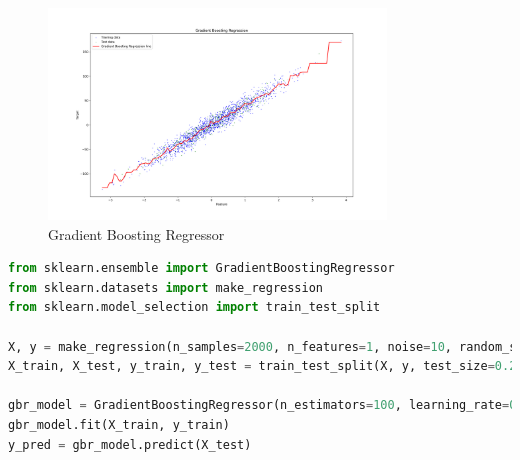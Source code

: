 \begin{figure}[H]
	\centering
	\includegraphics[width=0.8\textwidth]{./Images/Gradient-Boosting-Regression.png}
	\caption{Gradient Boosting Regressor}
	\label{fig:gradient-boosting-regressor}
\end{figure}

\begin{lstlisting}[language=Python, caption=Gradient Boosting Regressor Example]
from sklearn.ensemble import GradientBoostingRegressor
from sklearn.datasets import make_regression
from sklearn.model_selection import train_test_split

X, y = make_regression(n_samples=2000, n_features=1, noise=10, random_state=42)
X_train, X_test, y_train, y_test = train_test_split(X, y, test_size=0.2, random_state=42)

gbr_model = GradientBoostingRegressor(n_estimators=100, learning_rate=0.1, max_depth=3, random_state=42)
gbr_model.fit(X_train, y_train)
y_pred = gbr_model.predict(X_test)
\end{lstlisting}

\clearpage